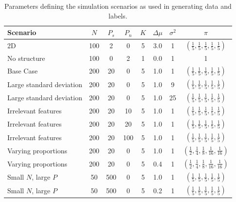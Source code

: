 \documentclass[]{article}
\begin{document}
\begin{table}[ht]
	\centering
	\begin{tabular}{|l|ccccccc|}
	\hline
	\textbf{Scenario} & $N$ & $P_s$ & $P_n$ & $K$ & $\Delta\mu$ & $\sigma^2$ & $\pi$\\
	\hline 
	2D & 100 & 2 & 0 & 5 & 3.0 & 1 &  $(\frac{1}{5} , \frac{1}{5}, \frac{1}{5}, \frac{1}{5}, \frac{1}{5})$ \\
	No structure & 100 & 0 & 2 & 1 & 0.0 & 1 & 1 \\
	Base Case & 200 & 20 & 0 & 5 & 1.0 & 1 &  $(\frac{1}{5} , \frac{1}{5}, \frac{1}{5}, \frac{1}{5}, \frac{1}{5})$\\
	Large standard deviation & 200 & 20 & 0 & 5 & 1.0 & 9 & $(\frac{1}{5} , \frac{1}{5}, \frac{1}{5}, \frac{1}{5}, \frac{1}{5})$ \\
	Large standard deviation & 200 & 20 & 0 & 5 & 1.0 & 25 &  $(\frac{1}{5} , \frac{1}{5}, \frac{1}{5}, \frac{1}{5}, \frac{1}{5})$\\
	Irrelevant features & 200 & 20 & 10 & 5 & 1.0 & 1 &  $(\frac{1}{5} , \frac{1}{5}, \frac{1}{5}, \frac{1}{5}, \frac{1}{5})$\\
	Irrelevant features & 200 & 20 & 20 & 5 & 1.0 & 1 &  $(\frac{1}{5} , \frac{1}{5}, \frac{1}{5}, \frac{1}{5}, \frac{1}{5})$\\
	Irrelevant features & 200 & 20 & 100 & 5 & 1.0 & 1 &  $(\frac{1}{5} , \frac{1}{5}, \frac{1}{5}, \frac{1}{5}, \frac{1}{5})$\\
	Varying proportions & 200 & 20 & 0 & 5 & 1.0 & 1 & $(\frac{1}{2} , \frac{1}{4}, \frac{1}{8}, \frac{1}{16}, \frac{1}{16})$ \\
	Varying proportions & 200 & 20 & 0 & 5 & 0.4 & 1 &  $(\frac{1}{2} , \frac{1}{4}, \frac{1}{8}, \frac{1}{16}, \frac{1}{16})$ \\ %
	Small $N$, large $P$ & 50 & 500 & 0 & 5 & 1.0 & 1 &  $(\frac{1}{5} , \frac{1}{5}, \frac{1}{5}, \frac{1}{5}, \frac{1}{5})$\\
	Small $N$, large $P$ & 50 & 500 & 0 & 5 & 0.2 & 1 &  $(\frac{1}{5} , \frac{1}{5}, \frac{1}{5}, \frac{1}{5}, \frac{1}{5})$
	\\
	\hline
	\end{tabular}
	\caption{Parameters defining the simulation scenarios as used in generating data and labels.}
	\label{table:scenarioTable}
\end{table}%
\end{document}
